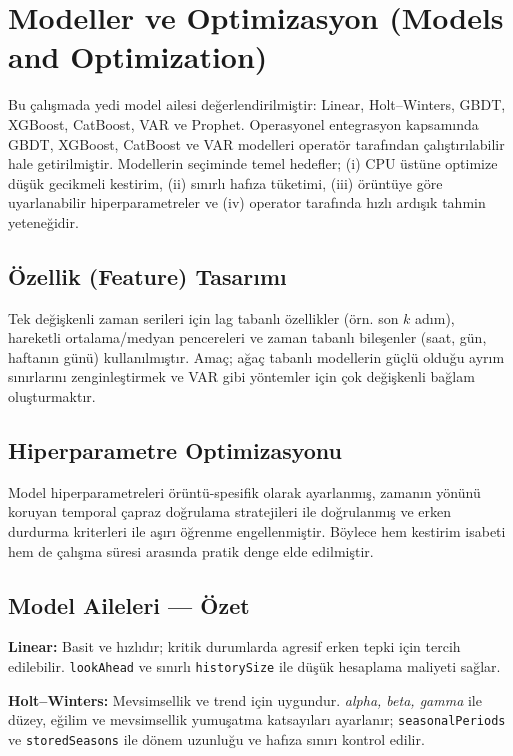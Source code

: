 \section{Modeller ve Optimizasyon (Models and Optimization)}

Bu çalışmada yedi model ailesi değerlendirilmiştir: Linear, Holt–Winters, GBDT, XGBoost, CatBoost, VAR ve Prophet. Operasyonel entegrasyon kapsamında GBDT, XGBoost, CatBoost ve VAR modelleri operatör tarafından çalıştırılabilir hale getirilmiştir. Modellerin seçiminde temel hedefler; (i) CPU üstüne optimize düşük gecikmeli kestirim, (ii) sınırlı hafıza tüketimi, (iii) örüntüye göre uyarlanabilir hiperparametreler ve (iv) operator tarafında hızlı ardışık tahmin yeteneğidir.

\subsection{Özellik (Feature) Tasarımı}

Tek değişkenli zaman serileri için lag tabanlı özellikler (örn. son $k$ adım), hareketli ortalama/medyan pencereleri ve zaman tabanlı bileşenler (saat, gün, haftanın günü) kullanılmıştır. Amaç; ağaç tabanlı modellerin güçlü olduğu ayrım sınırlarını zenginleştirmek ve VAR gibi yöntemler için çok değişkenli bağlam oluşturmaktır.

\subsection{Hiperparametre Optimizasyonu}

Model hiperparametreleri örüntü-spesifik olarak ayarlanmış, zamanın yönünü koruyan temporal çapraz doğrulama stratejileri ile doğrulanmış ve erken durdurma kriterleri ile aşırı öğrenme engellenmiştir. Böylece hem kestirim isabeti hem de çalışma süresi arasında pratik denge elde edilmiştir.

\subsection{Model Aileleri — Özet}

\textbf{Linear:} Basit ve hızlıdır; kritik durumlarda agresif erken tepki için tercih edilebilir. \texttt{lookAhead} ve sınırlı \texttt{historySize} ile düşük hesaplama maliyeti sağlar.

\textbf{Holt–Winters:} Mevsimsellik ve trend için uygundur. \textit{alpha, beta, gamma} ile düzey, eğilim ve mevsimsellik yumuşatma katsayıları ayarlanır; \texttt{seasonalPeriods} ve \texttt{storedSeasons} ile dönem uzunluğu ve hafıza sınırı kontrol edilir.

